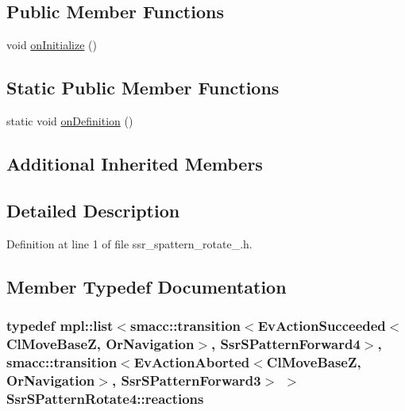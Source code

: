 \subsection*{Public Member Functions}
\begin{DoxyCompactItemize}
\item 
void \hyperlink{structSsrSPatternRotate4_aace2b26d4d2dc87438c14e0c625aeb05}{on\+Initialize} ()
\end{DoxyCompactItemize}
\subsection*{Static Public Member Functions}
\begin{DoxyCompactItemize}
\item 
static void \hyperlink{structSsrSPatternRotate4_ae63657dc25c546ffaafa01427c8f0dca}{on\+Definition} ()
\end{DoxyCompactItemize}
\subsection*{Additional Inherited Members}


\subsection{Detailed Description}


Definition at line 1 of file ssr\+\_\+spattern\+\_\+rotate\+\_.\+h.



\subsection{Member Typedef Documentation}
\subsubsection[{\texorpdfstring{reactions}{reactions}}]{\setlength{\rightskip}{0pt plus 5cm}typedef mpl\+::list$<${\bf smacc\+::transition}$<$Ev\+Action\+Succeeded$<$Cl\+Move\+BaseZ, Or\+Navigation$>$, {\bf Ssr\+S\+Pattern\+Forward4}$>$, {\bf smacc\+::transition}$<$Ev\+Action\+Aborted$<$Cl\+Move\+BaseZ, Or\+Navigation$>$, {\bf Ssr\+S\+Pattern\+Forward3}$>$ $>$ {\bf Ssr\+S\+Pattern\+Rotate4\+::reactions}}\hypertarget{structSsrSPatternRotate4_a5fc19348bc1542dd740c3ffac81a75c0}{}\label{structSsrSPatternRotate4_a5fc19348bc1542dd740c3ffac81a75c0}


